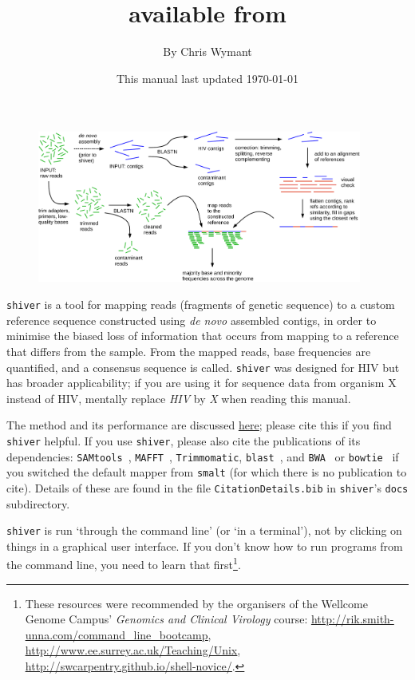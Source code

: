 \documentclass{article}
\title{\shiv\\available from \href{https://github.com/ChrisHIV/shiver}{\www{https://github.com/ChrisHIV/shiver}}}
\date{This manual last updated \today}
\author{By Chris Wymant}
\newcommand{\shiv}{\c{shiver}\xspace}
\let\c\texttt
\newcommand{\www}{\color{blue} \underline}
\begin{document}
\maketitle


\begin{figure}[!h]
\centering
\includegraphics[width=0.95\textwidth]{AssemblyPipelineDiagram_ForPaper.pdf}
\end{figure}


\shiv is a tool for mapping reads (fragments of genetic sequence) to a custom reference sequence constructed using {\it de novo} assembled contigs, in order to minimise the biased loss of information that occurs from mapping to a reference that differs from the sample.
From the mapped reads, base frequencies are quantified, and a consensus sequence is called.
\shiv was designed for HIV but has broader applicability; if you are using it for sequence data from organism X instead of HIV, mentally replace {\it HIV} by {\it X} when reading this manual.

The method and its performance are discussed \href{https://doi.org/10.1093/ve/vey007}{\www{here}}; please cite this if you find \shiv helpful.
If you use \shiv, please also cite the publications of its dependencies: \c{SAMtools}~\cite{Li08062009}, \c{MAFFT}~\cite{Katoh15072002}, \c{Trimmomatic}\cite{Bolger01082014}, \c{blast}~\cite{ALTSCHUL1990403}, and \c{BWA}~\cite{doi:10.1093/bioinformatics/btp698} or \c{bowtie}~\cite{Langmead2009} if you switched the default mapper from \c{smalt} (for which there is no publication to cite).
Details of these are found in the file \c{CitationDetails.bib} in \shiv's \c{docs} subdirectory.

\shiv is run `through the command line' (or `in a terminal'), not by clicking on things in a graphical user interface.
If you don't know how to run programs from the command line, you need to learn that first\footnote{These resources were recommended by the organisers of the Wellcome Genome Campus' {\it Genomics and Clinical Virology} course: \href{http://rik.smith-unna.com/command_line_bootcamp}{\www{http://rik.smith-unna.com/command\_line\_bootcamp}},\\
\href{http://www.ee.surrey.ac.uk/Teaching/Unix}{\www{http://www.ee.surrey.ac.uk/Teaching/Unix}},\\
\href{http://swcarpentry.github.io/shell-novice/}{\www{http://swcarpentry.github.io/shell-novice/}}.}.
\end{document}
